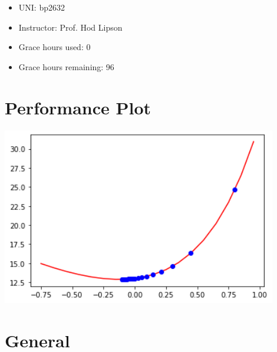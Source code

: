 \documentclass[twoside,11pt]{homework}
\date{September 17, 2023} %
\begin{document}
\maketitle
\begin{itemize}
    \item UNI: bp2632
    \item Instructor: Prof. Hod Lipson
    \item Grace hours used: 0 
    \item Grace hours remaining: 96
\end{itemize}
\newpage


\section*{Performance Plot}

\includegraphics[width=0.9\textwidth]{output.png}
\section*{General}
\end{document}
